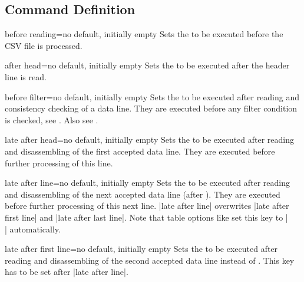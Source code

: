 \documentclass[a4paper,11pt]{ltxdoc}
\begin{document}
\subsection{Command Definition}%

\begin{docCsvKey}{before reading}{=}{no default, initially empty}
  Sets the  to be executed before the CSV file is processed.
\end{docCsvKey}

\begin{docCsvKey}{after head}{=}{no default, initially empty}
  Sets the  to be executed after the header line is read.
\end{docCsvKey}

\begin{docCsvKey}{before filter}{=}{no default, initially empty}
  Sets the  to be executed after reading and consistency checking
  of a data line. They are executed before any filter condition is checked,
  see .
  Also see .
\end{docCsvKey}

\begin{docCsvKey}{late after head}{=}{no default, initially empty}
  Sets the  to be executed after reading and disassembling
  of the first accepted data line. They are executed before further processing
  of this line.
\end{docCsvKey}

\begin{docCsvKey}{late after line}{=}{no default, initially empty}
  Sets the  to be executed after reading and disassembling
  of the next accepted data line (after ).
  They are executed before further processing of this next line.
  |late after line| overwrites |late after first line| and |late after last line|.
  Note that table options like  set this key to |\\|
  automatically.
\end{docCsvKey}


\begin{docCsvKey}{late after first line}{=}{no default, initially empty}
  Sets the  to be executed after reading and disassembling
  of the second accepted data line instead of .
  This key has to be set after |late after line|.
\end{docCsvKey}
\end{document}
